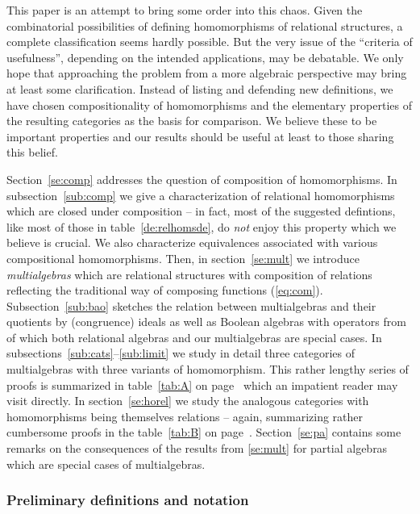 \documentclass[10pt]{article}
\begin{document}
This paper is an attempt to bring some order into this
chaos. 
Given the combinatorial possibilities of defining homomorphisms of relational 
structures, a complete classification seems hardly possible. But the very issue of
the ``criteria of usefulness'', depending on the intended applications, may be debatable.
We only hope that approaching the problem from a more algebraic perspective
may bring at least some clarification. 
Instead of listing and defending new definitions, we have chosen compositionality
of homomorphisms and the elementary properties of the resulting categories as the basis
for comparison. We believe these to be important properties and our results should be 
useful at least to those sharing this belief.

Section~\ref{se:comp}
addresses the question of composition of homomorphisms.  In
subsection~\ref{sub:comp} we give a characterization of relational
homomorphisms which are closed under composition -- in fact, most of
the suggested defintions, like most of those in
table~\ref{de:relhomsde}, do {\em not} enjoy this property which we
believe is crucial.  We also characterize equivalences associated with
various compositional homomorphisms. 
Then, in section~\ref{se:mult} we introduce {\em
multialgebras} which are relational structures with composition of
relations reflecting the traditional way of
composing functions (\ref{eq:com}).  Subsection~\ref{sub:bao} sketches the relation
between multialgebras and their quotients by (congruence) ideals as well as
Boolean algebras with operators from \cite{JT1} of which both
relational algebras \cite{JT2} and our multialgebras are special
cases.  In subsections~\ref{sub:cats}--\ref{sub:limit} we study in
detail three categories of multialgebras with three variants of
homomorphism. This rather lengthy series of proofs is summarized in
table~\ref{tab:A} on page~\pageref{tab:A} which an impatient reader
may visit directly.  In section~\ref{se:horel} we study the analogous
categories with homomorphisms being themselves relations -- again,
summarizing rather cumbersome proofs in the table~\ref{tab:B} on
page~\pageref{tab:B}.  Section~\ref{se:pa} contains some remarks on
the consequences of the results from \ref{se:mult} for partial
algebras which are special cases of multialgebras.

\subsubsection*{Preliminary definitions and notation}
\end{document}
